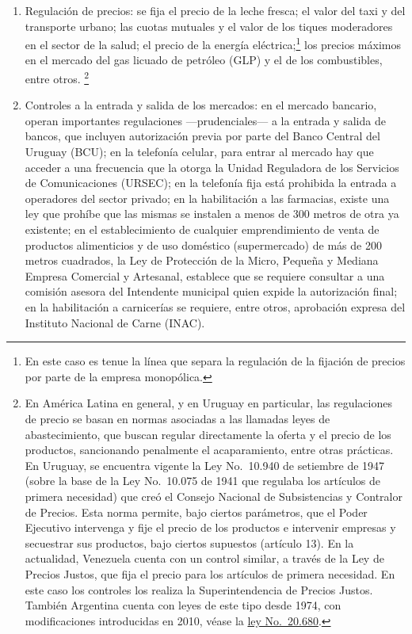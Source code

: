 \documentclass[
  12pt,
  spanish,
]{book}
\begin{document}
\begin{enumerate}
\def\labelenumi{\arabic{enumi}.}
\item
  Regulación de precios: se fija el precio de la leche fresca; el valor
  del taxi y del transporte urbano; las cuotas mutuales y el valor de
  los tiques moderadores en el sector de la salud; el precio de la
  energía eléctrica;\footnote{En este caso es tenue la línea que separa
    la regulación de la fijación de precios por parte de la empresa
    monopólica.} los precios máximos en el mercado del gas licuado de
  petróleo (GLP) y el de los combustibles, entre otros. \footnote{En
    América Latina en general, y en Uruguay en particular, las
    regulaciones de precio se basan en normas asociadas a las llamadas
    leyes de abastecimiento, que buscan regular directamente la oferta y
    el precio de los productos, sancionando penalmente el acaparamiento,
    entre otras prácticas. En Uruguay, se encuentra vigente la Ley
    No.~10.940 de setiembre de 1947 (sobre la base de la Ley No.~10.075
    de 1941 que regulaba los artículos de primera necesidad) que creó el
    Consejo Nacional de Subsistencias y Contralor de Precios. Esta norma
    permite, bajo ciertos parámetros, que el Poder Ejecutivo intervenga
    y fije el precio de los productos e intervenir empresas y secuestrar
    sus productos, bajo ciertos supuestos (artículo 13). En la
    actualidad, Venezuela cuenta con un control similar, a través de la
    Ley de Precios Justos, que fija el precio para los artículos de
    primera necesidad. En este caso los controles los realiza la
    Superintendencia de Precios Justos. También Argentina cuenta con
    leyes de este tipo desde 1974, con modificaciones introducidas en
    2010, véase la
    \href{http://infoleg.mecon.gov.ar/infolegInternet/anexos/55000-59999/58603/texact.htm}{ley
    No.~20.680}.}
\item
  Controles a la entrada y salida de los mercados: en el mercado
  bancario, operan importantes regulaciones ---prudenciales--- a la
  entrada y salida de bancos, que incluyen autorización previa por parte
  del Banco Central del Uruguay (BCU); en la telefonía celular, para
  entrar al mercado hay que acceder a una frecuencia que la otorga la
  Unidad Reguladora de los Servicios de Comunicaciones (URSEC); en la
  telefonía fija está prohibida la entrada a operadores del sector
  privado; en la habilitación a las farmacias, existe una ley que
  prohíbe que las mismas se instalen a menos de 300 metros de otra ya
  existente; en el establecimiento de cualquier emprendimiento de venta
  de productos alimenticios y de uso doméstico (supermercado) de más de
  200 metros cuadrados, la Ley de Protección de la Micro, Pequeña y
  Mediana Empresa Comercial y Artesanal, establece que se requiere
  consultar a una comisión asesora del Intendente municipal quien expide
  la autorización final; en la habilitación a carnicerías se requiere,
  entre otros, aprobación expresa del Instituto Nacional de Carne
  (INAC).
\end{enumerate}
\end{document}
